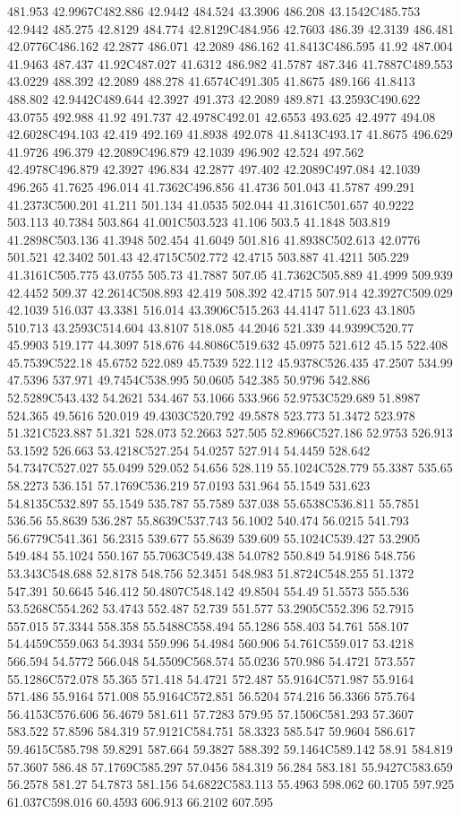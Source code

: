 481.953 42.9967C482.886 42.9442 484.524 43.3906 486.208 43.1542C485.753 42.9442 485.275 42.8129 484.774 42.8129C484.956 42.7603 486.39 42.3139 486.481 42.0776C486.162 42.2877 486.071 42.2089 486.162 41.8413C486.595 41.92 487.004 41.9463 487.437 41.92C487.027 41.6312 486.982 41.5787 487.346 41.7887C489.553 43.0229 488.392 42.2089 488.278 41.6574C491.305 41.8675 489.166 41.8413 488.802 42.9442C489.644 42.3927 491.373 42.2089 489.871 43.2593C490.622 43.0755 492.988 41.92 491.737 42.4978C492.01 42.6553 493.625 42.4977 494.08 42.6028C494.103 42.419 492.169 41.8938 492.078 41.8413C493.17 41.8675 496.629 41.9726 496.379 42.2089C496.879 42.1039 496.902 42.524 497.562 42.4978C496.879 42.3927 496.834 42.2877 497.402 42.2089C497.084 42.1039 496.265 41.7625 496.014 41.7362C496.856 41.4736 501.043 41.5787 499.291 41.2373C500.201 41.211 501.134 41.0535 502.044 41.3161C501.657 40.9222 503.113 40.7384 503.864 41.001C503.523 41.106 503.5 41.1848 503.819 41.2898C503.136 41.3948 502.454 41.6049 501.816 41.8938C502.613 42.0776 501.521 42.3402 501.43 42.4715C502.772 42.4715 503.887 41.4211 505.229 41.3161C505.775 43.0755 505.73 41.7887 507.05 41.7362C505.889 41.4999 509.939 42.4452 509.37 42.2614C508.893 42.419 508.392 42.4715 507.914 42.3927C509.029 42.1039 516.037 43.3381 516.014 43.3906C515.263 44.4147 511.623 43.1805 510.713 43.2593C514.604 43.8107 518.085 44.2046 521.339 44.9399C520.77 45.9903 519.177 44.3097 518.676 44.8086C519.632 45.0975 521.612 45.15 522.408 45.7539C522.18 45.6752 522.089 45.7539 522.112 45.9378C526.435 47.2507 534.99 47.5396 537.971 49.7454C538.995 50.0605 542.385 50.9796 542.886 52.5289C543.432 54.2621 534.467 53.1066 533.966 52.9753C529.689 51.8987 524.365 49.5616 520.019 49.4303C520.792 49.5878 523.773 51.3472 523.978 51.321C523.887 51.321 528.073 52.2663 527.505 52.8966C527.186 52.9753 526.913 53.1592 526.663 53.4218C527.254 54.0257 527.914 54.4459 528.642 54.7347C527.027 55.0499 529.052 54.656 528.119 55.1024C528.779 55.3387 535.65 58.2273 536.151 57.1769C536.219 57.0193 531.964 55.1549 531.623 54.8135C532.897 55.1549 535.787 55.7589 537.038 55.6538C536.811 55.7851 536.56 55.8639 536.287 55.8639C537.743 56.1002 540.474 56.0215 541.793 56.6779C541.361 56.2315 539.677 55.8639 539.609 55.1024C539.427 53.2905 549.484 55.1024 550.167 55.7063C549.438 54.0782 550.849 54.9186 548.756 53.343C548.688 52.8178 548.756 52.3451 548.983 51.8724C548.255 51.1372 547.391 50.6645 546.412 50.4807C548.142 49.8504 554.49 51.5573 555.536 53.5268C554.262 53.4743 552.487 52.739 551.577 53.2905C552.396 52.7915 557.015 57.3344 558.358 55.5488C558.494 55.1286 558.403 54.761 558.107 54.4459C559.063 54.3934 559.996 54.4984 560.906 54.761C559.017 53.4218 566.594 54.5772 566.048 54.5509C568.574 55.0236 570.986 54.4721 573.557 55.1286C572.078 55.365 571.418 54.4721 572.487 55.9164C571.987 55.9164 571.486 55.9164 571.008 55.9164C572.851 56.5204 574.216 56.3366 575.764 56.4153C576.606 56.4679 581.611 57.7283 579.95 57.1506C581.293 57.3607 583.522 57.8596 584.319 57.9121C584.751 58.3323 585.547 59.9604 586.617 59.4615C585.798 59.8291 587.664 59.3827 588.392 59.1464C589.142 58.91 584.819 57.3607 586.48 57.1769C585.297 57.0456 584.319 56.284 583.181 55.9427C583.659 56.2578 581.27 54.7873 581.156 54.6822C583.113 55.4963 598.062 60.1705 597.925 61.037C598.016 60.4593 606.913 66.2102 607.595 